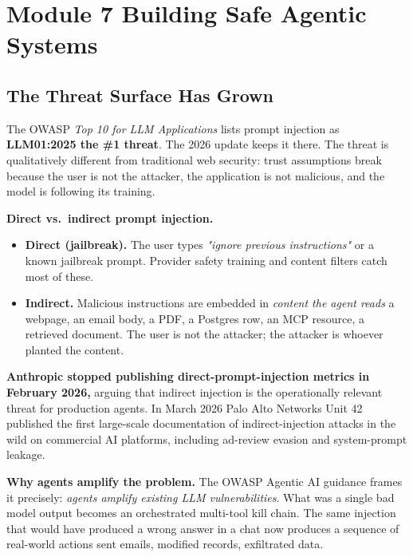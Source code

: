 \documentclass[a4paper,11pt]{article}
\begin{document}
\section{Module 7 \textemdash{} Building Safe Agentic Systems}

\subsection{The Threat Surface Has Grown}

The OWASP \textit{Top 10 for LLM Applications} lists prompt injection
as \textbf{LLM01:2025 \textemdash{} the \#1 threat}. The 2026 update
keeps it there. The threat is qualitatively different from
traditional web security: trust assumptions break because the user
is not the attacker, the application is not malicious, and the model
is following its training.

\textbf{Direct vs.\ indirect prompt injection.}

\begin{itemize}[noitemsep, leftmargin=1.2em]
  \item \textbf{Direct (jailbreak).} The user types
        \textit{"ignore previous instructions"} or a known
        jailbreak prompt. Provider safety training and content
        filters catch most of these.
  \item \textbf{Indirect.} Malicious instructions are embedded in
        \emph{content the agent reads} \textemdash{} a webpage, an
        email body, a PDF, a Postgres row, an MCP resource, a
        retrieved document. The user is not the attacker; the
        attacker is whoever planted the content.
\end{itemize}

\begin{warning}
\textbf{Anthropic stopped publishing direct-prompt-injection metrics
in February 2026,} arguing that indirect injection is the
operationally relevant threat for production agents. In March 2026
Palo Alto Networks Unit 42 published the first large-scale
documentation of indirect-injection attacks in the wild on
commercial AI platforms, including ad-review evasion and
system-prompt leakage.
\end{warning}

\textbf{Why agents amplify the problem.} The OWASP Agentic AI
guidance frames it precisely: \emph{agents amplify existing LLM
vulnerabilities}. What was a single bad model output becomes an
orchestrated multi-tool kill chain. The same injection that would
have produced a wrong answer in a chat now produces a sequence of
real-world actions \textemdash{} sent emails, modified records,
exfiltrated data.
\end{document}
